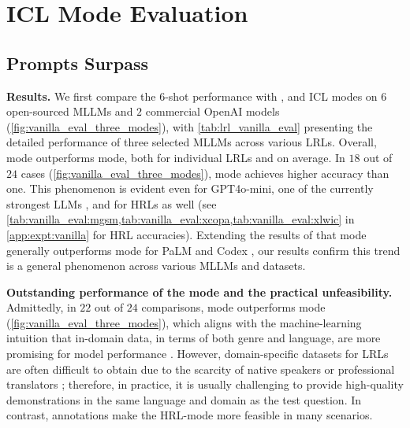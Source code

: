 \section{ICL Mode Evaluation}
\subsection{\multilingual Prompts Surpass \english} \label{sec:icl_mode_eval:multilingual_vs_english}





\noindent\textbf{Results.}
We first compare the $6$-shot performance with \english, \multilingual and \native ICL modes on $6$ open-sourced MLLMs and $2$ commercial OpenAI models (\cref{fig:vanilla_eval_three_modes}), with \cref{tab:lrl_vanilla_eval} presenting the detailed performance of three selected MLLMs across various LRLs.
Overall, \multilingual mode outperforms \english mode, both for individual LRLs and on average.
In $18$ out of $24$ cases (\cref{fig:vanilla_eval_three_modes}), \multilingual mode achieves higher accuracy than \english one.
This phenomenon is evident even for \textsf{GPT4o-mini}, one of the currently strongest LLMs \cite{chatbot_arena}, and for HRLs as well (see \cref{tab:vanilla_eval:mgsm,tab:vanilla_eval:xcopa,tab:vanilla_eval:xlwic} in \cref{app:expt:vanilla} for HRL accuracies).
Extending the results of \citet{mgsm} that \multilingual mode generally outperforms \english mode for PaLM \citep{palm} and Codex \citep{codex}, our results confirm this trend is a general phenomenon across various MLLMs and datasets.

\vspace{2pt}\noindent\textbf{Outstanding performance of the \native mode and the practical unfeasibility.}
Admittedly, in $22$ out of $24$ comparisons, \native mode outperforms \multilingual mode (\cref{fig:vanilla_eval_three_modes}), which aligns with the machine-learning intuition that in-domain data, in terms of both genre and language, are more promising for model performance \citep{is_translation_all_you_need}. However, domain-specific datasets for LRLs are often difficult to obtain due to the scarcity of native speakers or professional translators \citep{nllb, nllb-200}; therefore, in practice, it is usually challenging to provide high-quality demonstrations in the same language and domain as the test question.
In contrast, annotations make the HRL-\multilingual mode more feasible in many scenarios.


